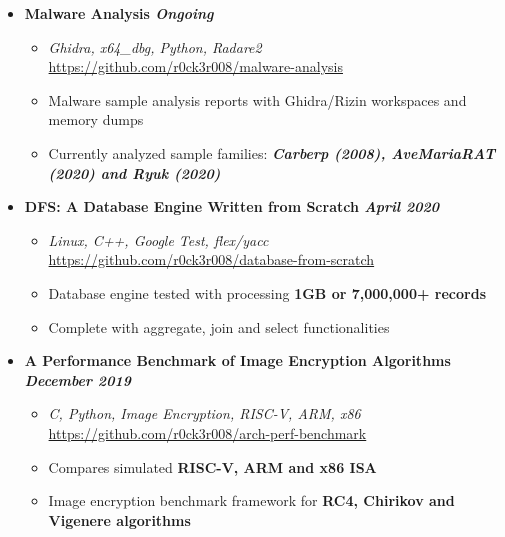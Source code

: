 \documentclass[9]{Resume}
\begin{document}
\begin{itemize}[noitemsep,nolistsep]
    \item[]\textbf{Malware Analysis \hfill \textit{Ongoing}}
        \begin{itemize}[leftmargin=*]
            \setlength\itemsep{-0.25em}
            \item[\textbullet]\textit{Ghidra, x64\_dbg, Python, Radare2} \hfill \href{https://github.com/r0ck3r008/malware-analysis}{{\scriptsize https://github.com/r0ck3r008/malware-analysis}}
            \item[\textbullet]Malware sample analysis reports with Ghidra/Rizin workspaces and memory dumps
			\item[\textbullet]Currently analyzed sample families: \textbf{\textit{Carberp (2008), AveMariaRAT (2020) and Ryuk (2020)}}
        \end{itemize}

    \item[]\textbf{DFS: A Database Engine Written from Scratch \hfill \textit{April 2020}}
        \begin{itemize}[leftmargin=*]
            \setlength\itemsep{-0.25em}
            \item[\textbullet]\textit{Linux, C++, Google Test, flex/yacc} \hfill \href{https://github.com/r0ck3r008/database-from-scratch}{{\scriptsize https://github.com/r0ck3r008/database-from-scratch}}
            \item[\textbullet]Database engine tested with processing \textbf{1GB or 7,000,000+ records}
            \item[\textbullet]Complete with aggregate, join and select functionalities
        \end{itemize}

    \item[]\textbf{A Performance Benchmark of Image Encryption Algorithms \hfill \textit{December 2019}}
        \begin{itemize}[leftmargin=*]
            \setlength\itemsep{-0.25em}
            \item[\textbullet]\textit{C, Python, Image Encryption, RISC-V, ARM, x86} \hfill \href{https://github.com/r0ck3r008/arch-perf-benchmark}{{\scriptsize https://github.com/r0ck3r008/arch-perf-benchmark}}
            \item[\textbullet]Compares simulated \textbf{RISC-V, ARM and x86 ISA}
            \item[\textbullet]Image encryption benchmark framework for \textbf{RC4, Chirikov and Vigenere algorithms}
        \end{itemize}


\end{itemize}
\end{document}
